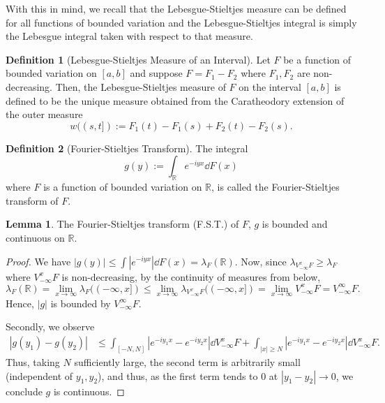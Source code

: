 \documentclass[]{article}
\theoremstyle{definition}
\theoremstyle{definition}
\newtheorem{definition}{Definition}[section]
\newtheorem{lemma}{Lemma}[section]
\begin{document}
With this in mind, we recall that the Lebesgue-Stieltjes measure can be defined 
for all functions of bounded variation and the Lebesgue-Stieltjes integral is 
simply the Lebesgue integral taken with respect to that measure.

\begin{definition}[Lebesgue-Stieltjes Measure of an Interval]
  Let \(F\) be a function of bounded variation on \([a, b]\) and suppose 
  \(F = F_1 - F_2\) where \(F_1, F_2\) are non-decreasing. Then, the 
  Lebesgue-Stieltjes measure of \(F\) on 
  the interval \([a, b]\) is defined to be the unique measure obtained from 
  the Caratheodory extension of the outer measure 
  \[w((s, t]) := F_1(t) - F_1(s) + F_2(t) - F_2(s).\]
\end{definition}

\begin{definition}[Fourier-Stieltjes Transform]
  The integral 
  \[g(y) := \int_{\mathbb{R}} e^{-iyx} \dd F(x)\]
  where \(F\) is a function of bounded variation on \(\mathbb{R}\), is 
  called the Fourier-Stieltjes transform of \(F\).
\end{definition}

\begin{lemma}
  The Fourier-Stieltjes transform (F.S.T.) of \(F\), \(g\) is bounded and continuous 
  on \(\mathbb{R}\).
\end{lemma}
\begin{proof}
  We have \(|g(y)| \le \int |e^{-iyx}| \dd F(x) = \lambda_F(\mathbb{R})\). Now, 
  since \(\lambda_{V_{-\infty}^xF} \ge \lambda_F\) where \(V_{-\infty}^xF\) is 
  non-decreasing, by the continuity of measures from below, 
  \[\lambda_F(\mathbb{R}) = \lim_{x \to \infty}\lambda_F((-\infty, x]) \le 
    \lim_{x \to \infty} \lambda_{V_{-\infty}^xF}((-\infty, x]) = 
    \lim_{x \to \infty} V_{-\infty}^xF = V_{-\infty}^\infty F.\]
  Hence, \(|g|\) is bounded by \(V_{-\infty}^\infty F\).

  Secondly, we observe 
  \[\begin{split}
    |g(y_1) - g(y_2)| & \le \int_{[-N, N]} |e^{-iy_1x} - e^{-iy_2x}| \dd V_{-\infty}^xF 
    + \int_{|x| \ge N} |e^{-iy_1x} - e^{-iy_2x}| \dd V_{-\infty}^xF. 
  \end{split}\]
  Thus, taking \(N\) sufficiently large, the second term is arbitrarily small 
  (independent of \(y_1, y_2\)), and thus, as the first term tends to 0 at 
  \(|y_1 - y_2| \to 0\), we conclude \(g\) is continuous.
\end{proof}
\end{document}
